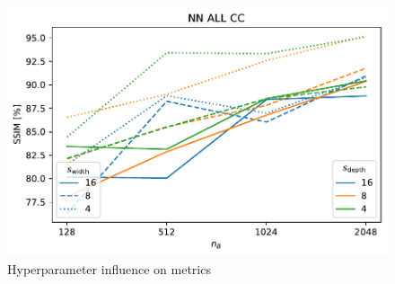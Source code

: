 \begin{figure}
{\begin{minipage}{0.6\textwidth}
    \end{minipage}%
    \begin{minipage}{0.6\textwidth}
    \includegraphics[width=\textwidth]{figures/comparison_CIFAR10_hyperparameters_SSIM_NN_ALL_CC.pdf}
    \end{minipage}
    }
    \caption{Hyperparameter influence on metrics}
    \label{fig:HyperparamInfluence}
\end{figure}



